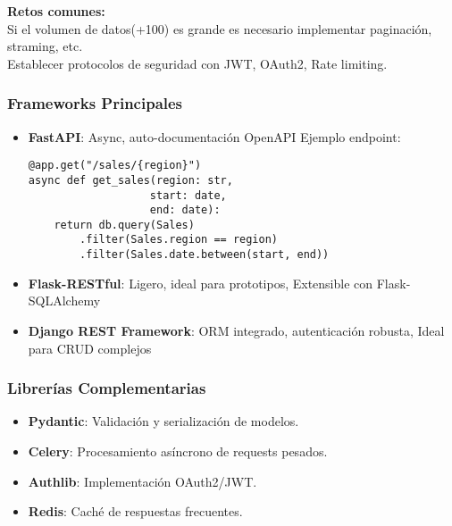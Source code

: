\documentclass[12pt]{book}
\begin{document}
\textbf{Retos comunes:}\\
Si el volumen de datos(+100) es grande es necesario implementar paginación, straming, etc. \\
Establecer protocolos de seguridad con JWT, OAuth2, Rate limiting.

\subsubsection{Frameworks Principales}
\begin{itemize}
    \item \textbf{FastAPI}: Async, auto-documentación OpenAPI
        Ejemplo endpoint:
        \begin{verbatim}
@app.get("/sales/{region}")
async def get_sales(region: str, 
                   start: date, 
                   end: date):
    return db.query(Sales)
        .filter(Sales.region == region)
        .filter(Sales.date.between(start, end))
        \end{verbatim}
    
    \item \textbf{Flask-RESTful}: Ligero, ideal para prototipos, Extensible con Flask-SQLAlchemy
    
    \item \textbf{Django REST Framework}: ORM integrado, autenticación robusta, Ideal para CRUD complejos

\end{itemize}

\subsubsection{Librerías Complementarias}
\begin{itemize}
    \item \textbf{Pydantic}: Validación y serialización de modelos.
    \item \textbf{Celery}: Procesamiento asíncrono de requests pesados.
    \item \textbf{Authlib}: Implementación OAuth2/JWT.
    \item \textbf{Redis}: Caché de respuestas frecuentes.
\end{itemize}
\end{document}
